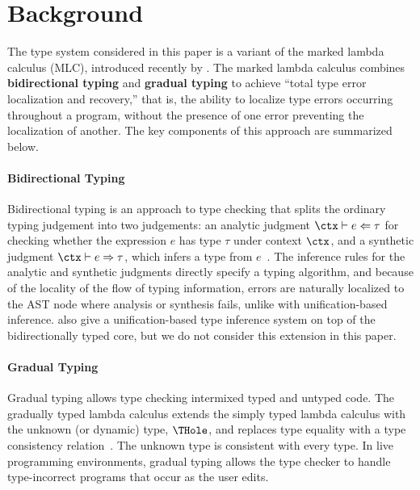 \section{Background}
\label{sec:Background}

The type system considered in this paper is a variant of the marked lambda calculus (MLC), introduced recently by \citet{DBLP:journals/pacmpl/ZhaoMDBPO24}. The marked lambda calculus combines \textbf{bidirectional typing} and \textbf{gradual typing} to achieve ``total type error localization and recovery,'' that is, the ability to localize type errors occurring throughout a program, without the presence of one error preventing the localization of another. The key components of this approach are summarized below. 

\paragraph{Bidirectional Typing} Bidirectional typing is an approach to type checking that splits the ordinary typing judgement into two judgements: an analytic judgment $\ctx\vdash e\Leftarrow\tau$ for checking whether the expression $e$ has type $\tau$ under context $\ctx$, and a synthetic judgment $\ctx\vdash e\Rightarrow\tau$, which infers a type from $e$~\cite{DBLP:journals/csur/DunfieldK21,pierce2000}. 
The inference rules for the analytic and synthetic judgments directly specify a typing algorithm, and because of the locality of the flow of typing information, errors are naturally localized to the AST node where analysis or synthesis fails, unlike with unification-based inference. \citet{DBLP:journals/pacmpl/ZhaoMDBPO24} also give a unification-based type inference system on top of the bidirectionally typed core, but we do not consider this extension in this paper.

\paragraph{Gradual Typing} Gradual typing allows type checking intermixed typed and untyped code. The gradually typed lambda calculus extends the simply typed lambda calculus with the unknown (or dynamic) type, $\THole$, and replaces type equality with a type consistency relation~\cite{siek2006,siek2015}. The unknown type is consistent with every type. In live programming environments, gradual typing allows the type checker to handle type-incorrect programs that occur as the user edits.


